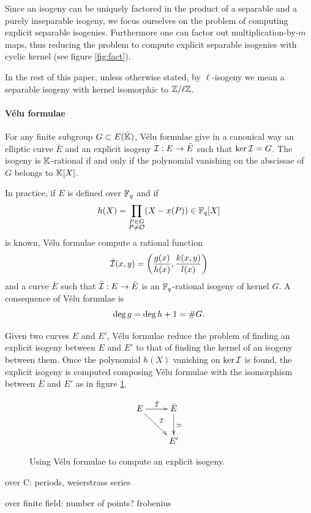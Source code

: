 Since an isogeny can be uniquely factored in the product of a
separable and a purely inseparable isogeny, we focus ourselves on the
problem of computing explicit separable isogenies. Furthermore one can
factor out multiplication-by-$m$ maps, thus reducing the problem to
compute explicit separable isogenies with cyclic kernel (see figure
\ref{fig:fact}).

In the rest of this paper, unless otherwise stated, by $\ell$-isogeny
we mean a separable isogeny with kernel isomorphic to $\mathbb{Z}/\ell\mathbb{Z}$.

\paragraph{Vélu formulae}
For any finite subgroup $G \subset E(\bar{\mathbb{K}})$, Vélu formulae
\cite{Vel71} give in a canonical way an elliptic curve $\bar{E}$ and
an explicit isogeny $\mathcal{I}:E\rightarrow \bar{E}$ such that
$\ker\mathcal{I}=G$. The isogeny is $\mathbb{K}$-rational if and only if the polynomial
vanishing on the abscissae of $G$ belongs to $\mathbb{K}[X]$.

In practice, if $E$ is defined over $\mathbb{F}_q$ and if
\[h(X) = \prod_{\substack{P\in G\\P\ne\mathcal{O}}}(X - x(P)) \in \mathbb{F}_q[X]\]
is known, Vélu formulae compute a rational function
\begin{equation}
  \label{eq:isog}
  \bar{\mathcal{I}}(x,y) = \left(\frac{g(x)}{h(x)}, \frac{k(x,y)}{l(x)}\right)  
\end{equation}
and a curve $\bar{E}$ such that $\bar{\mathcal{I}} : E\rightarrow\bar{E}$ is an
$\mathbb{F}_q$-rational isogeny of kernel $G$. A consequence of Vélu formulae
is
\begin{equation}
  \label{eq:velu-deg}
  \deg g = \deg h + 1 = \# G
  \text{.}
\end{equation}

Given two curves $E$ and $E'$, Vélu formulae reduce the problem of
finding an explicit isogeny between $E$ and $E'$ to that of finding
the kernel of an isogeny between them. Once the polynomial $h(X)$
vanishing on $\ker\mathcal{I}$ is found, the explicit isogeny is computed
composing Vélu formulae with the isomorphism between $\bar{E}$ and
$E'$ as in figure \ref{fig:velu}.

\begin{figure}
  \centering
  \[\xymatrix{
    E \ar[r]^{\bar{\I}} \ar[rd]^\I & \bar{E} \ar[d]^{\simeq}\\
    & E'
  }\]
  \caption{Using Vélu formulae to compute an explicit isogeny.}
  \label{fig:velu}
\end{figure}



over C: periods, weierstrass series

over finite field: number of points? frobenius


%

